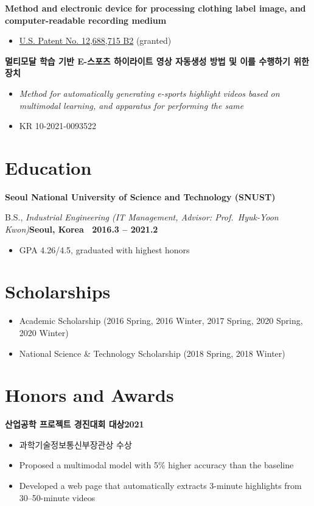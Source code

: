 \documentclass[10pt,a4paper]{article}
\newcommand{\entry}[2]{\par\noindent#1\hfill#2\par}
\newcommand{\titled}[2]{\par\vspace{3pt}\entry{\textbf{#1}}{\textbf{#2}}}
\begin{document}
\titled{Method and electronic device for processing clothing label image, and computer-readable
recording medium}{}
\begin{itemize}
  \item \href{https://patents.google.com/patent/US12688715B2/en}{U.S. Patent No. 12,688,715 B2} (granted)
\end{itemize}

\titled{멀티모달 학습 기반 E-스포츠 하이라이트 영상 자동생성 방법 및 이를 수행하기 위한 장치}{}
\begin{itemize}
  \item \textit{Method for automatically generating e-sports highlight videos based on multimodal
        learning, and apparatus for performing the same}
  \item KR 10-2021-0093522
\end{itemize}

\section{Education}

\titled{Seoul National University of Science and Technology (SNUST)}{}
\entry{B.S., \textit{Industrial Engineering (IT Management, Advisor: Prof.\ Hyuk-Yoon Kwon)}}%
      {\textbf{Seoul, Korea \textbar\ 2016.3 -- 2021.2}}
\begin{itemize}
  \item GPA 4.26/4.5, graduated with highest honors
\end{itemize}

\section{Scholarships}
\begin{itemize}
  \item Academic Scholarship (2016 Spring, 2016 Winter, 2017 Spring, 2020 Spring, 2020 Winter)
  \item National Science \& Technology Scholarship (2018 Spring, 2018 Winter)
\end{itemize}

\section{Honors and Awards}

\titled{산업공학 프로젝트 경진대회 대상}{2021}
\begin{itemize}
  \item 과학기술정보통신부장관상 수상
  \item Proposed a multimodal model with 5\% higher accuracy than the baseline
  \item Developed a web page that automatically extracts 3-minute highlights from 30--50-minute videos
\end{itemize}
\end{document}
